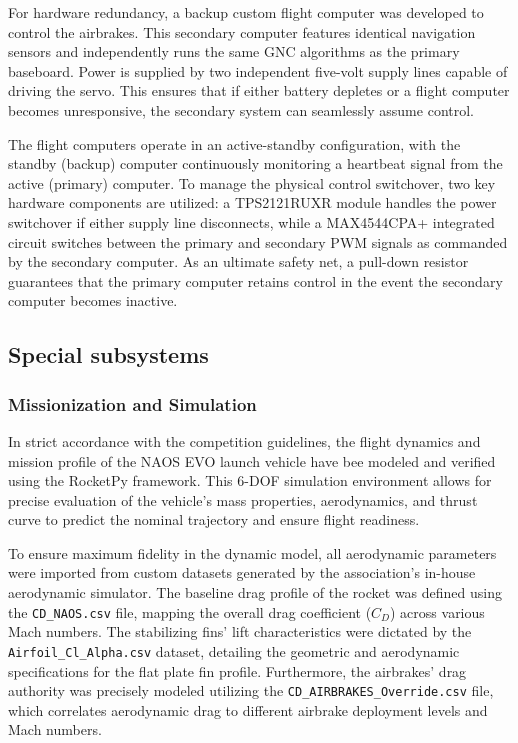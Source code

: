 \documentclass[11pt, a4paper]{article} %
\begin{document}
For hardware redundancy, a backup custom flight computer was developed to control the airbrakes. This secondary computer features identical navigation sensors and independently runs the same GNC algorithms as the primary baseboard. Power is supplied by two independent five-volt supply lines capable of driving the servo. This ensures that if either battery depletes or a flight computer becomes unresponsive, the secondary system can seamlessly assume control.

The flight computers operate in an active-standby configuration, with the standby (backup) computer continuously monitoring a heartbeat signal from the active (primary) computer. To manage the physical control switchover, two key hardware components are utilized: a TPS2121RUXR module handles the power switchover if either supply line disconnects, while a MAX4544CPA+ integrated circuit switches between the primary and secondary PWM signals as commanded by the secondary computer. As an ultimate safety net, a pull-down resistor guarantees that the primary computer retains control in the event the secondary computer becomes inactive.

\subsection{Special subsystems} 


\subsubsection{Missionization and Simulation}

In strict accordance with the competition guidelines, the flight dynamics and mission profile of the NAOS EVO launch vehicle have bee modeled and verified using the RocketPy framework. This 6-DOF simulation environment allows for precise evaluation of the vehicle's mass properties, aerodynamics, and thrust curve to predict the nominal trajectory and ensure flight readiness.

To ensure maximum fidelity in the dynamic model, all aerodynamic parameters were imported from custom datasets generated by the association's in-house aerodynamic simulator. The baseline drag profile of the rocket was defined using the \texttt{CD\_NAOS.csv} file, mapping the overall drag coefficient ($C_D$) across various Mach numbers. The stabilizing fins' lift characteristics were dictated by the \texttt{Airfoil\_Cl\_Alpha.csv} dataset, detailing the geometric and aerodynamic specifications for the flat plate fin profile. Furthermore, the airbrakes' drag authority was precisely modeled utilizing the \texttt{CD\_AIRBRAKES\_Override.csv} file, which correlates aerodynamic drag to different airbrake deployment levels and Mach numbers.
\end{document}
